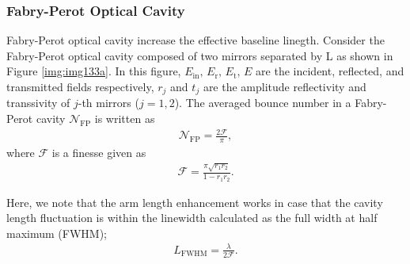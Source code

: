 \subsubsection{Fabry-Perot Optical Cavity}
Fabry-Perot optical cavity increase the effective baseline linegth. Consider the Fabry-Perot optical cavity composed of two mirrors separated by L as shown in Figure \ref{img:img133a}. In this figure, $E_{\mathrm{in}},\,E_{\mathrm{r}},\,E_{\mathrm{t}},\,E$ are the incident, reflected, and transmitted fields respectively, $r_{j}$ and $t_{j}$ are the amplitude reflectivity and transsivity of $j$-th mirrors ($j=1,2$). The averaged bounce number in a Fabry-Perot cavity $\mathcal{N}_{\mathrm{FP}}$ is written as \cite{ando1999power}
\begin{eqnarray}
  \mathcal{N}_{\mathrm{FP}} = \frac{2\mathcal{F}}{\pi},
\end{eqnarray}
where $\mathcal{F}$ is a finesse given as
\begin{eqnarray}
  \mathcal{F}=\frac{\pi \sqrt{r_{1} r_{2}}}{1-r_{1} r_{2}}.
\end{eqnarray}

Here, we note that the arm length enhancement works in case that the cavity length fluctuation is within the linewidth calculated as the full width at half maximum (FWHM);
\begin{eqnarray}
  L_{\mathrm{FWHM}} = \frac{\lambda}{2\mathcal{F}}\label{eq:eq131}.
\end{eqnarray}


